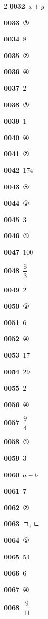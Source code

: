 \documentclass[10pt,a4paper]{article}
\begin{document}
\begin{multicols}{2}
\noindent\textbf{0032}\ $x+y$\par
\noindent\textbf{0033}\ ③\par
\noindent\textbf{0034}\ $8$\par
\noindent\textbf{0035}\ ②\par
\noindent\textbf{0036}\ ④\par
\noindent\textbf{0037}\ $2$\par
\noindent\textbf{0038}\ ③\par
\noindent\textbf{0039}\ $1$\par
\noindent\textbf{0040}\ ④\par
\noindent\textbf{0041}\ ②\par
\noindent\textbf{0042}\ $174$\par
\noindent\textbf{0043}\ ⑤\par
\noindent\textbf{0044}\ ③\par
\noindent\textbf{0045}\ $3$\par
\noindent\textbf{0046}\ ①\par
\noindent\textbf{0047}\ $100$\par
\noindent\textbf{0048}\ $\dfrac{5}{3}$\par
\noindent\textbf{0049}\ $2$\par
\noindent\textbf{0050}\ ②\par
\noindent\textbf{0051}\ $6$\par
\noindent\textbf{0052}\ ④\par
\noindent\textbf{0053}\ $17$\par
\noindent\textbf{0054}\ $29$\par
\noindent\textbf{0055}\ $2$\par
\noindent\textbf{0056}\ ④\par
\noindent\textbf{0057}\ $\dfrac{9}{4}$\par
\noindent\textbf{0058}\ ①\par
\noindent\textbf{0059}\ $3$\par
\noindent\textbf{0060}\ $a-b$\par
\noindent\textbf{0061}\ $7$\par
\noindent\textbf{0062}\ ②\par
\noindent\textbf{0063}\ ㄱ, ㄴ\par
\noindent\textbf{0064}\ ⑤\par
\noindent\textbf{0065}\ $54$\par
\noindent\textbf{0066}\ $6$\par
\noindent\textbf{0067}\ ④\par
\noindent\textbf{0068}\ $\dfrac{9}{11}$\par

\end{multicols}
\end{document}
